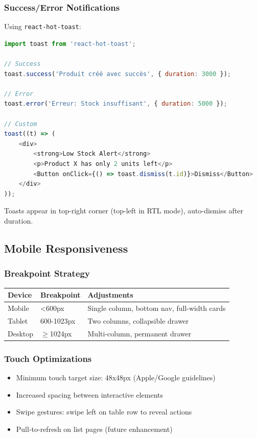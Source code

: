 \subsubsection{Success/Error Notifications}

Using \texttt{react-hot-toast}:

\begin{lstlisting}[language=JavaScript,label=lst:notifications]
import toast from 'react-hot-toast';

// Success
toast.success('Produit créé avec succès', { duration: 3000 });

// Error
toast.error('Erreur: Stock insuffisant', { duration: 5000 });

// Custom
toast((t) => (
    <div>
        <strong>Low Stock Alert</strong>
        <p>Product X has only 2 units left</p>
        <Button onClick={() => toast.dismiss(t.id)}>Dismiss</Button>
    </div>
));
\end{lstlisting}

Toasts appear in top-right corner (top-left in RTL mode), auto-dismiss after duration.

\subsection{Mobile Responsiveness}

\subsubsection{Breakpoint Strategy}

\begin{center}
\begin{tabular}{@{}lll@{}}
\toprule
\textbf{Device} & \textbf{Breakpoint} & \textbf{Adjustments} \\
\midrule
Mobile & <600px & Single column, bottom nav, full-width cards \\
Tablet & 600-1023px & Two columns, collapsible drawer \\
Desktop & $\geq$1024px & Multi-column, permanent drawer \\
\bottomrule
\end{tabular}
\end{center}

\subsubsection{Touch Optimizations}

\begin{itemize}
    \item Minimum touch target size: 48x48px (Apple/Google guidelines)
    \item Increased spacing between interactive elements
    \item Swipe gestures: swipe left on table row to reveal actions
    \item Pull-to-refresh on list pages (future enhancement)
\end{itemize}


